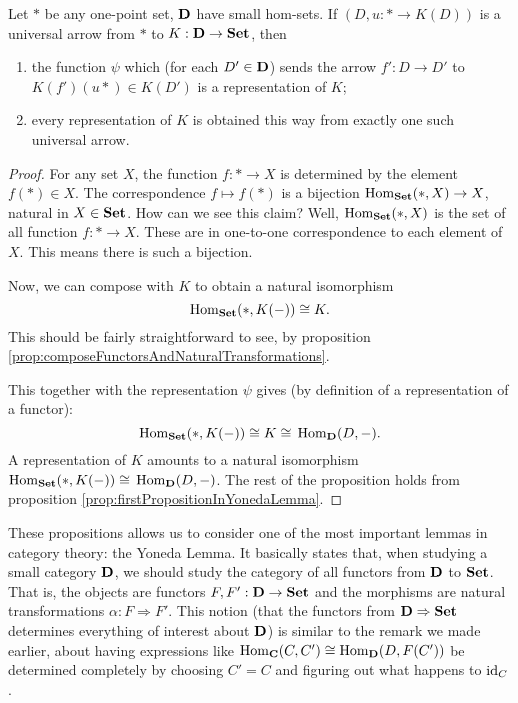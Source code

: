\begin{prop}%
Let $*$ be any one-point set, $\mathbf{D}$ have small hom-sets. If
$(D,u:*\to{}K(D))$ is a universal arrow from $*$ to
$K:\mathbf{D}\to{}\mathbf{Set}$, then
\begin{enumerate}
\item the function $\psi$ which (for each $D'\in\mathbf{D}$) sends
  the arrow $f':D\to{}D'$ to $K(f')(u*)\in{}K(D')$ is a
  representation of $K$;
\item every representation of $K$ is obtained this way from
  exactly one such universal arrow.
\end{enumerate}
\end{prop}
\begin{proof}
For any set $X$, the function $f:*\to{}X$ is determined by the
element $f(*)\in{}X$. The correspondence $f\mapsto{}f(*)$ is a
bijection $\operatorname{Hom}_{\mathbf{Set}}(*,X)\to{}X$, natural in
$X\in\mathbf{Set}$. How can we see this claim? Well,
$\operatorname{Hom}_{\mathbf{Set}}(*,X)$ is the set of all function
$f:*\to{}X$. These are in one-to-one correspondence to each
element of $X$. This means there is such a bijection. 

Now, we can compose with $K$ to obtain a natural isomorphism
\begin{equation}%
\hom_{\ms{Set}}(*,K(-))\cong{}K.
\end{equation}
This should be fairly straightforward to see, by proposition \ref{prop:composeFunctorsAndNaturalTransformations}.

This together with the representation $\psi$ gives (by definition
of a representation of a functor):
\begin{equation}%
\hom_{\ms{Set}}(*,K(-))\cong{}K\cong{}\hom_{\ms{D}}(D,-).
\end{equation}
A representation of $K$ amounts to a natural isomorphism
$\operatorname{Hom}_{\mathbf{Set}}(*,K(-))\cong{}\operatorname{Hom}_{\mathbf{D}}(D,-)$. The rest of
the proposition holds from proposition \ref{prop:firstPropositionInYonedaLemma}.
\end{proof}

These propositions allows us to consider one of the most
important lemmas in category theory: the Yoneda Lemma. It
basically states that, when studying a small category $\mathbf{D}$,
we should study the category of all functors from $\mathbf{D}$ to
$\mathbf{Set}$. That is, the objects are functors
$F,F':\mathbf{D}\to\mathbf{Set}$ and the morphisms are natural
transformations $\alpha:F\Rightarrow{F'}$. This notion (that the
functors from $\mathbf{D}\Rightarrow\mathbf{Set}$ determines everything
of interest about $\mathbf{D}$) is similar to the remark we made
earlier, about having expressions like
$\operatorname{Hom}_{\mathbf{C}}(C,C')\cong{\operatorname{Hom}_{\mathbf{D}}(D,F(C'))}$ be determined
completely by choosing $C'=C$ and figuring out what happens to $\operatorname{id}_{C}$.

